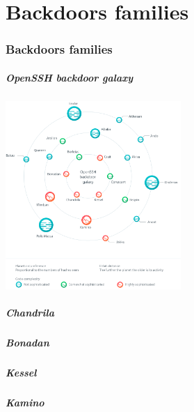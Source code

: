 \part{Backdoors families}
\section{Backdoors families}

\begin{frame}
	\partpage
\end{frame}

\begin{frame}
	\frametitle{OpenSSH backdoor galaxy}
	
   \begin{center}    
   \includegraphics[width=0.5\textwidth]{images/OpenSSH_backdoor_galaxy}
   \end{center}

\end{frame}

\begin{frame}
	\frametitle{Chandrila}
\end{frame}

\begin{frame}
	\frametitle{Bonadan}
\end{frame}

\begin{frame}
	\frametitle{Kessel}
\end{frame}

\begin{frame}
	\frametitle{Kamino}
\end{frame}
